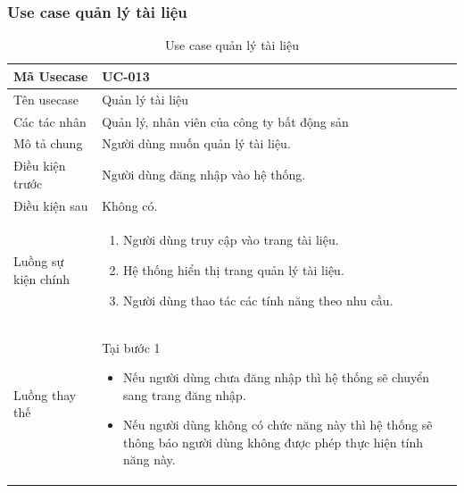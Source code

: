 \documentclass[12pt,a4paper]{article}
\begin{document}
    \subsubsection*{Use case quản lý tài liệu}
    \begin{table}[H]
        \centering
        \begin{tabular}{|p{3.5cm}|p{11.5cm}|c|}
            \hline
            Mã Usecase      & UC-013                                      \\
            \hline
            Tên usecase     & Quản lý tài liệu                            \\
            \hline
            Các tác nhân    & Quản lý, nhân viên của công ty bất động sản \\
            \hline
            Mô tả chung     & Người dùng muốn quản lý tài liệu.           \\
            \hline

            Điều kiện trước & Người dùng đăng nhập vào hệ thống.          \\
            \hline

            Điều kiện sau   & Không có.                                   \\
            \hline

            Luồng sự kiện chính & \vspace{-.8cm}\begin{enumerate}
                                                    \item Người dùng truy cập vào trang tài liệu.
                                                    \item Hệ thống hiển thị trang quản lý tài liệu.
                                                    \item Người dùng thao tác các tính năng theo nhu cầu.
            \end{enumerate}
            \\
            \hline
            Luồng thay thế & Tại bước 1\newline
            \vspace{-.8cm}\begin{itemize}
                              \item Nếu người dùng chưa đăng nhập thì hệ thống sẽ chuyển sang trang đăng nhập.
                              \item Nếu người dùng không có chức năng này thì hệ thống sẽ thông báo người dùng không được phép thực hiện tính năng này.
            \end{itemize}

            \\ \hline
        \end{tabular}
        \caption{Use case quản lý tài liệu}

    \end{table}
\end{document}
